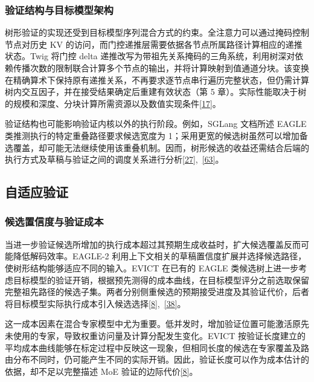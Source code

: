\documentclass[11pt,a4paper,UTF8,fontset=none,scheme=plain,zihao=-4]{ctexart}
\begin{document}
\hypertarget{section-4-1-3}{%
\subsubsection{验证结构与目标模型架构}\label{section-4-1-3}}

树形验证的实现还受到目标模型序列混合方式的约束。全注意力可以通过掩码控制节点对历史
KV 的访问，而门控递推层需要依据各节点所属路径计算相应的递推状态。Twig
将门控 delta
递推改写为带祖先关系掩码的三角系统，利用树深对依赖传播次数的限制联合计算多个节点的输出，并将计算映射到值通道分块。该变换在精确算术下保持原有递推关系，不再要求逐节点串行遍历完整状态，但仍需计算树内交互因子，并在接受结果确定后重建有效状态（第
5
章）。实际性能取决于树的规模和深度、分块计算所需资源以及数值实现条件\protect\hyperlink{ref-twig}{{[}17{]}}。

验证结构也可能影响验证内核以外的执行阶段。例如，SGLang 文档所述 EAGLE
类推测执行的特定重叠路径要求候选宽度为
1；采用更宽的候选树虽然可以增加备选覆盖，却可能无法继续使用该重叠机制。因而，树形候选的收益还需结合后端的执行方式及草稿与验证之间的调度关系进行分析\protect\hyperlink{ref-dflash}{{[}27{]}},~\protect\hyperlink{ref-sglangdocs}{{[}63{]}}。

\hypertarget{section-4-2}{%
\subsection{自适应验证}\label{section-4-2}}

\hypertarget{section-4-2-1}{%
\subsubsection{候选置信度与验证成本}\label{section-4-2-1}}

当进一步验证候选所增加的执行成本超过其预期生成收益时，扩大候选覆盖反而可能降低解码效率。EAGLE-2
利用上下文相关的草稿置信度扩展并选择候选路径，使树形结构能够适应不同的输入。EVICT
在已有的 EAGLE
类候选树上进一步考虑目标模型的验证开销，根据预先测得的成本曲线，在目标模型评分之前选取保留完整祖先路径的候选子集。两者分别侧重候选的预期接受进度及其验证代价，后者将目标模型实际执行成本引入候选选择\protect\hyperlink{ref-evict}{{[}8{]}},~\protect\hyperlink{ref-eagle2}{{[}38{]}}。

这一成本因素在混合专家模型中尤为重要。低并发时，增加验证位置可能激活原先未使用的专家，导致权重访问量及计算分配发生变化。EVICT
按验证长度建立的平均成本曲线能够在标定过程中反映这一现象，但相同长度的候选在专家覆盖及路由分布不同时，仍可能产生不同的实际开销。因此，验证长度可以作为成本估计的依据，却不足以完整描述
MoE 验证的边际代价\protect\hyperlink{ref-evict}{{[}8{]}}。
\end{document}
